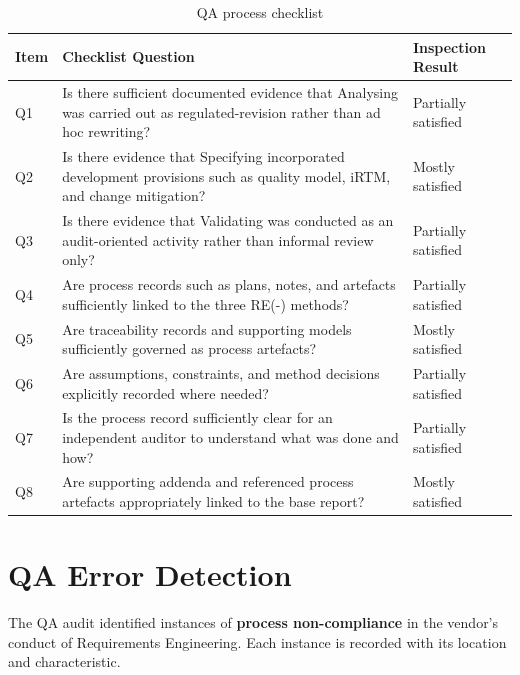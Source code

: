 \documentclass[11pt,a4paper]{article}
\begin{document}
\begin{table}[H]
\centering
\small
\renewcommand{\arraystretch}{1.4}
\begin{tabularx}{\textwidth}{|p{}|X|p{}|}
\hline
\rowcolor{tableheader}
\textbf{Item} & \textbf{Checklist Question} & \textbf{Inspection Result} \\
\hline
Q1 & Is there sufficient documented evidence that Analysing was carried out as regulated-revision rather than ad hoc rewriting? & Partially satisfied \\
\hline
Q2 & Is there evidence that Specifying incorporated development provisions such as quality model, iRTM, and change mitigation? & Mostly satisfied \\
\hline
Q3 & Is there evidence that Validating was conducted as an audit-oriented activity rather than informal review only? & Partially satisfied \\
\hline
Q4 & Are process records such as plans, notes, and artefacts sufficiently linked to the three RE(-) methods? & Partially satisfied \\
\hline
Q5 & Are traceability records and supporting models sufficiently governed as process artefacts? & Mostly satisfied \\
\hline
Q6 & Are assumptions, constraints, and method decisions explicitly recorded where needed? & Partially satisfied \\
\hline
Q7 & Is the process record sufficiently clear for an independent auditor to understand what was done and how? & Partially satisfied \\
\hline
Q8 & Are supporting addenda and referenced process artefacts appropriately linked to the base report? & Mostly satisfied \\
\hline
\end{tabularx}
\caption{QA process checklist}
\label{tab:qa-checklist}
\end{table}


\section{QA Error Detection}

The QA audit identified instances of \textbf{process non-compliance} in the vendor's conduct of Requirements Engineering. Each instance is recorded with its location and characteristic.
\end{document}
